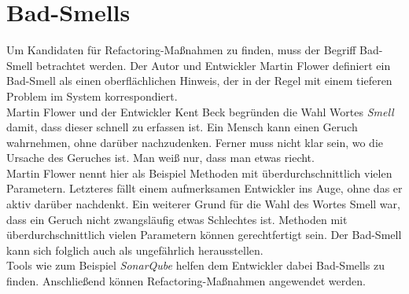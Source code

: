 \section{Bad-Smells}
Um Kandidaten für Refactoring-Maßnahmen zu finden, muss der Begriff Bad-Smell betrachtet werden. Der Autor und Entwickler Martin Flower definiert ein Bad-Smell als einen oberflächlichen Hinweis, der in der Regel mit einem tieferen Problem im System korrespondiert. \cite{martin_fowler_codesmell_nodate}\\
Martin Flower und der Entwickler Kent Beck begründen die Wahl Wortes \textit{Smell} damit, dass dieser schnell zu erfassen ist. Ein Mensch kann einen Geruch wahrnehmen, ohne darüber nachzudenken. Ferner muss nicht klar sein, wo die Ursache des Geruches ist. Man weiß nur, dass man etwas riecht.\\
Martin Flower nennt hier als Beispiel Methoden mit überdurchschnittlich vielen Parametern. Letzteres fällt einem aufmerksamen Entwickler ins Auge, ohne das er aktiv darüber nachdenkt. Ein weiterer Grund für die Wahl des Wortes Smell war, dass ein Geruch nicht zwangsläufig etwas Schlechtes ist. Methoden mit überdurchschnittlich vielen Parametern können gerechtfertigt sein. Der Bad-Smell kann sich folglich auch als ungefährlich herausstellen. \\
Tools wie zum Beispiel \textit{SonarQube} \cite{sonarqube_code_nodate} helfen dem Entwickler dabei Bad-Smells zu finden. Anschließend können Refactoring-Maßnahmen angewendet werden.

